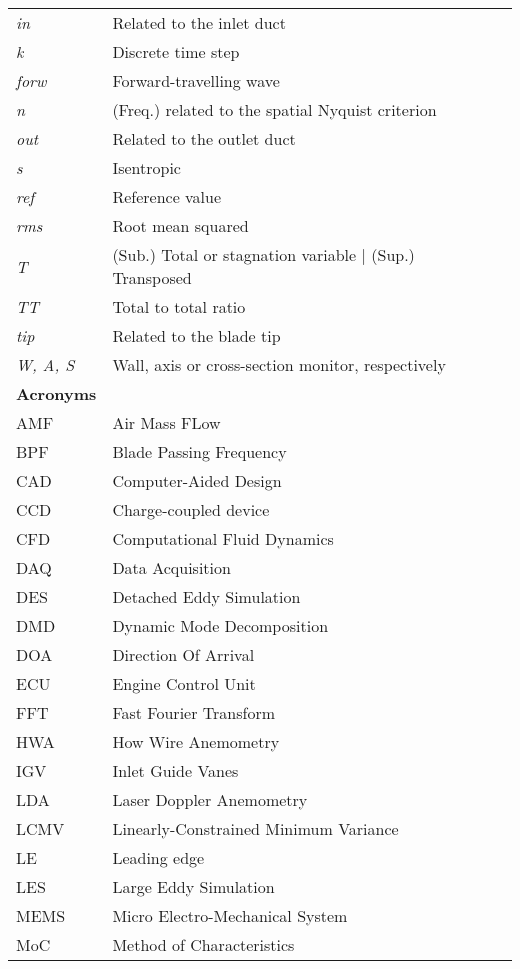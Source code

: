 \begin{longtable}{lll}
\emph{in} & Related to the inlet duct \\
\emph{k} & Discrete time step \\
\emph{forw} & Forward-travelling wave\\
\emph{n} & (Freq.) related to the spatial Nyquist criterion\\
\emph{out} & Related to the outlet duct \\
\emph{s} & Isentropic\\
\emph{ref} & Reference value \\
\emph{rms} & Root mean squared \\
\emph{T} & (Sub.) Total or stagnation variable | (Sup.) Transposed\\
\emph{TT} & Total to total ratio \\
\emph{tip} & Related to the blade tip \\
\emph{W, A, S} & Wall, axis or cross-section monitor, respectively\\[5mm]
\newpage
\multicolumn{2}{l} {\sffamily\bfseries\Large {Acronyms}} \\[3mm]
AMF & Air Mass FLow \\
BPF & Blade Passing Frequency\\
CAD & Computer-Aided Design \\
CCD & Charge-coupled device \\
CFD & Computational Fluid Dynamics \\
DAQ & Data Acquisition \\
DES & Detached Eddy Simulation\\
DMD & Dynamic Mode Decomposition \\
DOA & Direction Of Arrival \\
ECU & Engine Control Unit\\
FFT & Fast Fourier Transform \\
HWA & How Wire Anemometry \\
IGV & Inlet Guide Vanes \\
LDA & Laser Doppler Anemometry \\
LCMV & Linearly-Constrained Minimum Variance \\
LE & Leading edge \\ 
LES & Large Eddy Simulation \\
MEMS & Micro Electro-Mechanical System \\
MoC & Method of Characteristics \\

\end{longtable}
